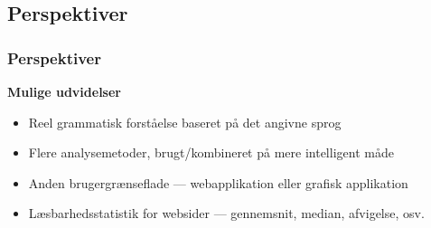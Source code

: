 \documentclass{beamer}
\begin{document}
\subsection{Perspektiver}
\begin{frame}
  \frametitle{Perspektiver}

  \textbf{Mulige udvidelser}

  \begin{itemize}
  \item<1-> Reel grammatisk forståelse baseret på det angivne sprog
  \item<2-> Flere analysemetoder, brugt/kombineret på mere intelligent måde
  \item<3-> Anden brugergrænseflade --- webapplikation eller grafisk applikation
  \item<4-> Læsbarhedsstatistik for websider --- gennemsnit, median, afvigelse, osv.
  \end{itemize}
\end{frame}
\end{document}
